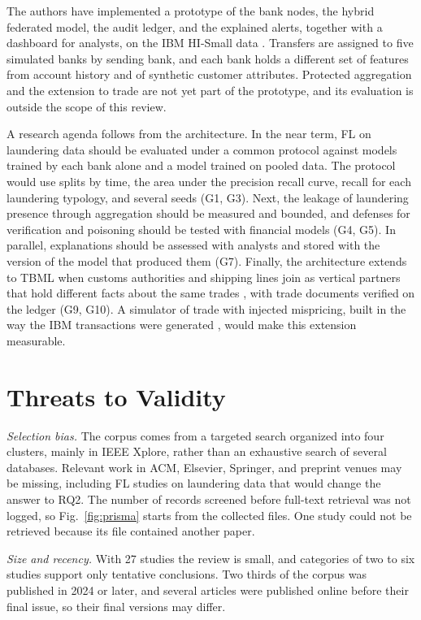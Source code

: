 \documentclass[journal]{IEEEtran}
\begin{document}
The authors have implemented a prototype of the bank nodes, the hybrid federated model, the audit ledger, and the explained alerts, together with a dashboard for analysts, on the IBM HI-Small data \cite{altman2023ibmaml}. Transfers are assigned to five simulated banks by sending bank, and each bank holds a different set of features from account history and of synthetic customer attributes. Protected aggregation and the extension to trade are not yet part of the prototype, and its evaluation is outside the scope of this review.

A research agenda follows from the architecture. In the near term, FL on laundering data should be evaluated under a common protocol against models trained by each bank alone and a model trained on pooled data. The protocol would use splits by time, the area under the precision recall curve, recall for each laundering typology, and several seeds (G1, G3). Next, the leakage of laundering presence through aggregation should be measured and bounded, and defenses for verification and poisoning should be tested with financial models (G4, G5). In parallel, explanations should be assessed with analysts and stored with the version of the model that produced them (G7). Finally, the architecture extends to TBML when customs authorities and shipping lines join as vertical partners that hold different facts about the same trades \cite{li2026plc}, with trade documents verified on the ledger \cite{dudczyk2024supply,cosmin2024notary} (G9, G10). A simulator of trade with injected mispricing, built in the way the IBM transactions were generated \cite{altman2023ibmaml}, would make this extension measurable.

\section{Threats to Validity}
\label{sec:validity}

\emph{Selection bias.} The corpus comes from a targeted search organized into four clusters, mainly in IEEE Xplore, rather than an exhaustive search of several databases. Relevant work in ACM, Elsevier, Springer, and preprint venues may be missing, including FL studies on laundering data that would change the answer to RQ2. The number of records screened before full-text retrieval was not logged, so Fig.~\ref{fig:prisma} starts from the collected files. One study could not be retrieved because its file contained another paper.

\emph{Size and recency.} With 27 studies the review is small, and categories of two to six studies support only tentative conclusions. Two thirds of the corpus was published in 2024 or later, and several articles were published online before their final issue, so their final versions may differ.
\end{document}
